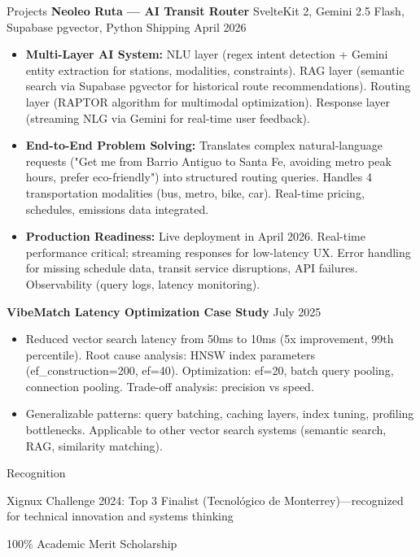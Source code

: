 \documentclass{resume}
\begin{document}
\begin{rSection}{Projects}
\textbf{Neoleo Ruta — AI Transit Router} {SvelteKit 2, Gemini 2.5 Flash, Supabase pgvector, Python} \hfill {Shipping April 2026}
\begin{itemize}
    \item \textbf{Multi-Layer AI System:} NLU layer (regex intent detection + Gemini entity extraction for stations, modalities, constraints). RAG layer (semantic search via Supabase pgvector for historical route recommendations). Routing layer (RAPTOR algorithm for multimodal optimization). Response layer (streaming NLG via Gemini for real-time user feedback).
    \item \textbf{End-to-End Problem Solving:} Translates complex natural-language requests ("Get me from Barrio Antiguo to Santa Fe, avoiding metro peak hours, prefer eco-friendly") into structured routing queries. Handles 4 transportation modalities (bus, metro, bike, car). Real-time pricing, schedules, emissions data integrated.
    \item \textbf{Production Readiness:} Live deployment in April 2026. Real-time performance critical; streaming responses for low-latency UX. Error handling for missing schedule data, transit service disruptions, API failures. Observability (query logs, latency monitoring).
\end{itemize}

\textbf{VibeMatch Latency Optimization Case Study} \hfill {July 2025}
\begin{itemize}
    \item Reduced vector search latency from 50ms to 10ms (5x improvement, 99th percentile). Root cause analysis: HNSW index parameters (ef\_construction=200, ef=40). Optimization: ef=20, batch query pooling, connection pooling. Trade-off analysis: precision vs speed.
    \item Generalizable patterns: query batching, caching layers, index tuning, profiling bottlenecks. Applicable to other vector search systems (semantic search, RAG, similarity matching).
\end{itemize}

\end{rSection}

\begin{rSection}{Recognition}
\item Xignux Challenge 2024: Top 3 Finalist (Tecnológico de Monterrey)—recognized for technical innovation and systems thinking
\item 100\% Academic Merit Scholarship
\end{rSection}
\end{document}
